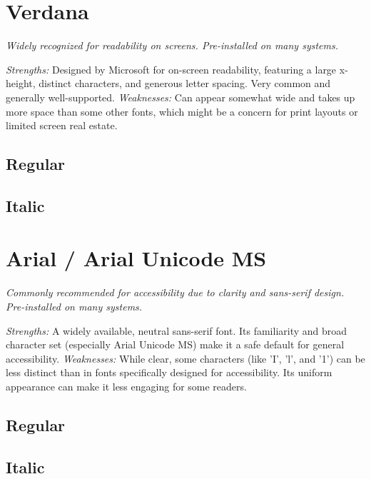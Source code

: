 \pagebreak
\section{Verdana}\label{sec:verdana}
\emph{Widely recognized for readability on screens. Pre-installed on many systems.}
\begin{raggedright}
\emph{Strengths:} Designed by Microsoft for on-screen readability, featuring a large x-height, distinct characters, and generous letter spacing. Very common and generally well-supported.
\emph{Weaknesses:} Can appear somewhat wide and takes up more space than some other fonts, which might be a concern for print layouts or limited screen real estate.

\subsection{Regular}
\FontSample{\verdanafont}

\subsection{Italic}
\FontSample{{\verdanafont\itshape}}
\end{raggedright}


\pagebreak
\section{Arial / Arial Unicode MS}\label{sec:arial}
\emph{Commonly recommended for accessibility due to clarity and sans-serif design. Pre-installed on many systems.}
\begin{raggedright}
\emph{Strengths:} A widely available, neutral sans-serif font. Its familiarity and broad character set (especially Arial Unicode MS) make it a safe default for general accessibility.
\emph{Weaknesses:} While clear, some characters (like 'I', 'l', and '1') can be less distinct than in fonts specifically designed for accessibility. Its uniform appearance can make it less engaging for some readers.

\subsection{Regular}
\FontSample{\arialfont}

\subsection{Italic}
\FontSample{{\arialfont\itshape}}
\end{raggedright}


